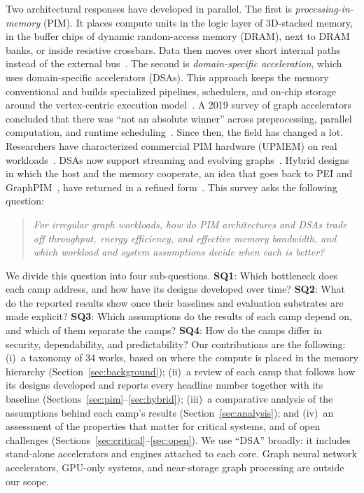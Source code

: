 \documentclass[journal,onecolumn]{IEEEtran}
\begin{document}
Two architectural responses have developed in parallel. The first is \emph{processing-in-memory} (PIM). It places compute units in the logic layer of 3D-stacked memory, in the buffer chips of dynamic random-access memory (DRAM), next to DRAM banks, or inside resistive crossbars. Data then moves over short internal paths instead of the external bus~\cite{ahn2015tesseract,song2018graphr,gomezluna2022prim}. The second is \emph{domain-specific acceleration}, which uses domain-specific accelerators (DSAs). This approach keeps the memory conventional and builds specialized pipelines, schedulers, and on-chip storage around the vertex-centric execution model~\cite{ham2016graphicionado,mukkara2018hats,yan2019graphdyns}. A 2019 survey of graph accelerators concluded that there was ``not an absolute winner'' across preprocessing, parallel computation, and runtime scheduling~\cite{gui2019survey}. Since then, the field has changed a lot. Researchers have characterized commercial PIM hardware (UPMEM) on real workloads~\cite{gomezluna2022prim,barkhordar2025alphapim}. DSAs now support streaming and evolving graphs~\cite{rahman2021jetstream,zhao2022tdgraph,gao2023mega}. Hybrid designs in which the host and the memory cooperate, an idea that goes back to PEI and GraphPIM~\cite{ahn2015pei,nai2017graphpim}, have returned in a refined form~\cite{shin2025piccolo,shin2025fala,yenimol2026cograf}. This survey asks the following question:

\begin{quote}\itshape
For irregular graph workloads, how do PIM architectures and DSAs trade off throughput, energy efficiency, and effective memory bandwidth, and which workload and system assumptions decide when each is better?
\end{quote}

We divide this question into four sub-questions. \textbf{SQ1}: Which bottleneck does each camp address, and how have its designs developed over time? \textbf{SQ2}: What do the reported results show once their baselines and evaluation substrates are made explicit? \textbf{SQ3}: Which assumptions do the results of each camp depend on, and which of them separate the camps? \textbf{SQ4}: How do the camps differ in security, dependability, and predictability? Our contributions are the following:
(i)~a taxonomy of 34 works, based on where the compute is placed in the memory hierarchy (Section~\ref{sec:background});
(ii)~a review of each camp that follows how its designs developed and reports every headline number together with its baseline (Sections~\ref{sec:pim}--\ref{sec:hybrid});
(iii)~a comparative analysis of the assumptions behind each camp's results (Section~\ref{sec:analysis});
and (iv)~an assessment of the properties that matter for critical systems, and of open challenges (Sections~\ref{sec:critical}--\ref{sec:open}).
We use ``DSA'' broadly: it includes stand-alone accelerators and engines attached to each core. Graph neural network accelerators, GPU-only systems, and near-storage graph processing are outside our scope.
\end{document}
